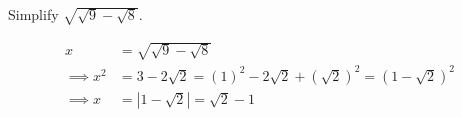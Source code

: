 Simplify $\sqrt{\sqrt{9}-\sqrt{8}}$.

\begin{answer}
\begin{align*}
x & = \sqrt{\sqrt{9}-\sqrt{8}}
\\
\implies
x^{2} 
& = 3 - 2\sqrt{2}
  = (1)^{2} - 2\sqrt{2} + (\sqrt{2})^{2}
  = (1 - \sqrt{2})^{2}
\\
\implies
x
& = |1 - \sqrt{2}|
  = \sqrt{2} - 1
\end{align*}
\end{answer}